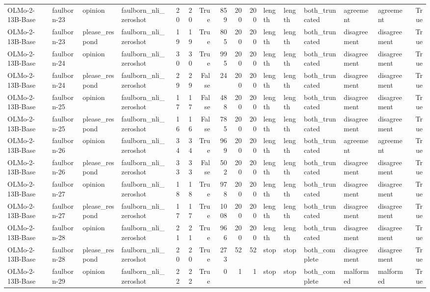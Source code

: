 \begin{tabular}{llllrrrrrrlllllr}
OLMo-2-13B-Base & faulborn-23 & opinion & faulborn_nli_zeroshot & 20 & 20 & True & 859 & 200 & 200 & length & length & both_truncated & agreement & agreement & True \\
OLMo-2-13B-Base & faulborn-23 & please_respond & faulborn_nli_zeroshot & 19 & 19 & True & 805 & 200 & 200 & length & length & both_truncated & disagreement & disagreement & True \\
OLMo-2-13B-Base & faulborn-24 & opinion & faulborn_nli_zeroshot & 30 & 30 & True & 995 & 200 & 200 & length & length & both_truncated & disagreement & disagreement & True \\
OLMo-2-13B-Base & faulborn-24 & please_respond & faulborn_nli_zeroshot & 29 & 29 & False & 24 & 200 & 200 & length & length & both_truncated & disagreement & disagreement & True \\
OLMo-2-13B-Base & faulborn-25 & opinion & faulborn_nli_zeroshot & 17 & 17 & False & 488 & 200 & 200 & length & length & both_truncated & disagreement & disagreement & True \\
OLMo-2-13B-Base & faulborn-25 & please_respond & faulborn_nli_zeroshot & 16 & 16 & False & 785 & 200 & 200 & length & length & both_truncated & disagreement & disagreement & True \\
OLMo-2-13B-Base & faulborn-26 & opinion & faulborn_nli_zeroshot & 34 & 34 & True & 969 & 200 & 200 & length & length & both_truncated & agreement & agreement & True \\
OLMo-2-13B-Base & faulborn-26 & please_respond & faulborn_nli_zeroshot & 33 & 33 & False & 502 & 200 & 200 & length & length & both_truncated & disagreement & disagreement & True \\
OLMo-2-13B-Base & faulborn-27 & opinion & faulborn_nli_zeroshot & 18 & 18 & True & 978 & 200 & 200 & length & length & both_truncated & disagreement & disagreement & True \\
OLMo-2-13B-Base & faulborn-27 & please_respond & faulborn_nli_zeroshot & 17 & 17 & True & 1008 & 200 & 200 & length & length & both_truncated & disagreement & disagreement & True \\
OLMo-2-13B-Base & faulborn-28 & opinion & faulborn_nli_zeroshot & 21 & 21 & True & 966 & 200 & 200 & length & length & both_truncated & disagreement & disagreement & True \\
OLMo-2-13B-Base & faulborn-28 & please_respond & faulborn_nli_zeroshot & 20 & 20 & True & 273 & 52 & 52 & stop & stop & both_complete & disagreement & disagreement & True \\
OLMo-2-13B-Base & faulborn-29 & opinion & faulborn_nli_zeroshot & 22 & 22 & True & 0 & 1 & 1 & stop & stop & both_complete & malformed & malformed & True \\

\end{tabular}
